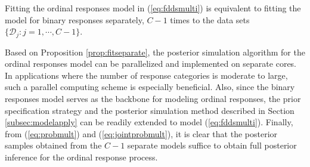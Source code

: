 \begin{proposition}
\label{prop:fitseparate}
Fitting the ordinal responses model in (\ref{eq:fddsmulti}) is equivalent to fitting 
the model for binary responses separately, $C-1$ times to the data sets 
$\{\boldsymbol{\mathcal{D}}_{j}: j=1,\cdots,C-1\}$.
\end{proposition}

Based on Proposition \ref{prop:fitseparate}, the posterior simulation algorithm for the ordinal 
responses model can be parallelized and implemented on separate cores. In applications where 
the number of response categories is moderate to large, such a parallel computing scheme 
is especially beneficial. Also, since the binary responses model serves as the backbone for 
modeling ordinal responses, the prior specification strategy and the posterior simulation 
method described in Section \ref{subsec:modelapply} can be readily extended to 
model (\ref{eq:fddsmulti}). Finally, from (\ref{eq:probmult}) and (\ref{eq:jointprobmult}), 
it is clear that the posterior samples obtained from the $C-1$ separate models suffice to 
obtain full posterior inference for the ordinal response process.
 
 
